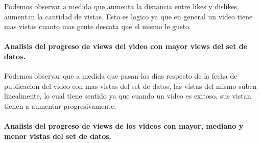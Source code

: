             \begin{figure}[ht]
            \end{figure}
        \FloatBarrier
        Podemos observar a medida que aumenta la distancia entre likes y dislikes,
        aumentan la cantidad de vistas. Esto es logico ya que en general un video
        tiene mas vistas cuanto mas gente descata que el mismo le gusto.
        \newpage

        \paragraph{Analisis del progreso de views del video con mayor views del set de datos.}

            \begin{figure}[ht]
            \end{figure}
        \FloatBarrier
        Podemos observar que a medida que pasan los dias respecto de la fecha de
        publicacion del video con mas vistas del set de datos, las vistas del
        mismo suben linealmente, lo cual tiene sentido ya que cuando un video
        es exitoso, sus vistan tienen a aumentar progresivamente.
        \newpage

        \paragraph{Analisis del progreso de views de los videos con mayor, mediano y menor vistas del set de datos.}

